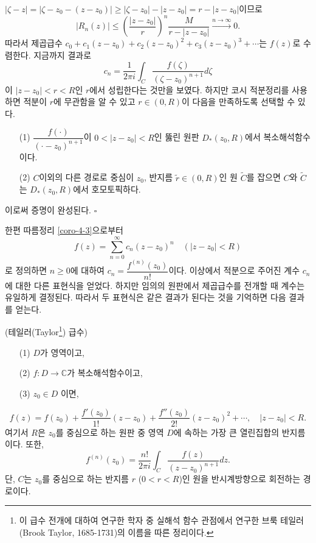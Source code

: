 $|\zeta-z| = |\zeta-z_0-(z-z_0)| \ge
|\zeta-z_0| - |z-z_0| = r - |z-z_0|$이므로
\[
|R_n(z)| \le \left( \dfrac{|z-z_0|}r \right)^n \dfrac M{r-|z-z_0|} 
\xrightarrow{n\to\infty} 0.
\]
따라서 제곱급수 $c_0 + c_1(z-z_0) + c_2(z-z_0)^2 + c_3(z-z_0)^3+ \cdots$는
$f(z)$로 수렴한다.
지금까지 결과로
\[
c_n = \dfrac1{2\pi i} \int_C \dfrac{f(\zeta)}{(\zeta-z_0)^{n+1}} d\zeta
\]
이 $|z-z_0|<r<R$인 $r$에서 성립한다는 것만을 보였다.
하지만 코시 적분정리를 사용하면 적분이 $r$에 무관함을 알 수 있고
$r\in (0,R)$이 다음을 만족하도록 선택할 수 있다.
\begin{itemize}
\item[(1)] $\dfrac{f(\cdot)}{(\cdot - z_0)^{n+1}}$이 
$0<|z-z_0|<R$인 뚫린 원판 $D_*(z_0,R)$에서 복소해석함수이다.
\item[(2)] $C$이외의 다른 경로로 중심이 $z_0$, 반지름 $\tilde r\in (0,R)$인 원 $\tilde C$를 잡으면
$C$와 $\tilde C$는 $D_*(z_0,R)$에서 호모토픽하다. 
\end{itemize}
이로써 증명이 완성된다. \hfill $\square$

한편 따름정리 \ref{coro-4-3}으로부터
\[
f(z) = \sum_{n=0}^\infty c_n(z-z_0)^n
\quad (|z-z_0| <R)
\]
로 정의하면 $n\ge0$에 대하여 $c_n = \dfrac{f^{(n)}(z_0)}{n!}$이다.
이상에서 적분으로 주어진 계수 $c_n$에 대한  다른 표현식을 얻었다.
하지만 임의의 원판에서 제곱급수를 전개할 때 계수는 유일하게 결정된다.
따라서 두 표현식은 같은 결과가 된다는 것을 기억하면 다음 결과를 얻는다.

\begin{salt_corollary}(테일러(Taylor\footnote{
이 급수 전개에 대하여 연구한 학자 중 실해석 함수 관점에서 연구한
브룩 테일러(Brook Taylor, 1685-1731)의 이름을 따른 정리이다.
})
 급수) \label{coro-4-4}
\begin{itemize}
\item[(1)] $D$가 영역이고,
\item[(2)] $f:D\to \mathbb C$가 복소해석함수이고,
\item[(3)] $z_0\in D$ 이면,
\end{itemize}
\[
f(z) = f(z_0) + \dfrac{f'(z_0)}{1!}(z-z_0) + \dfrac{f''(z_0)}{2!}(z-z_0)^ 2 
+ \cdots, \quad |z-z_0|<R.
\]
여기서 $R$은 $z_0$를 중심으로 하는 원판 중 영역 $D$에 속하는 가장 큰 열린집합의
반지름이다. 또한,
\begin{equation} \label{eq-4-2}
f^{(n)}(z_0) = \dfrac{n!}{2\pi i}\int_C \dfrac{f(z)}{(z-z_0)^{n+1}}dz.
\end{equation}
단, $C$는 $z_0$를 중심으로 하는 반지름 $r$ ($0<r<R$)인 원을 반시계방향으로 회전하는 경로이다.
\end{salt_corollary}

